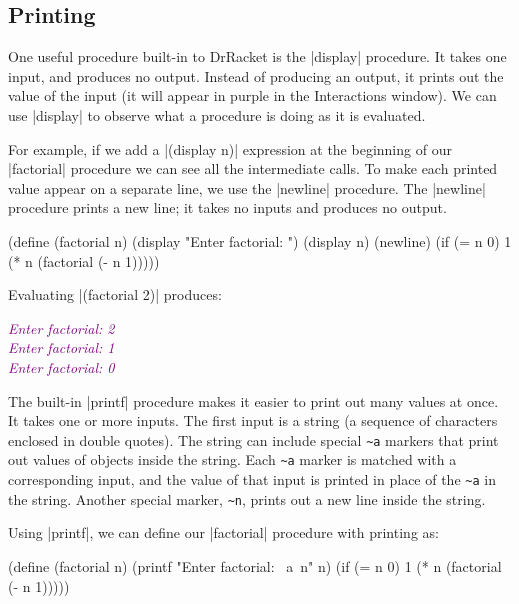 \begin{schemeregion}
\subsection{Printing}\label{sec:printing}

One useful procedure built-in to DrRacket is the \scheme|display| procedure.  It takes one input, and produces no output.  Instead of producing an output, it prints out the value of the input (it will appear in purple in the Interactions window).  We can use \scheme|display| to observe what a procedure is doing as it is evaluated.  

For example, if we add a \scheme|(display n)| expression at the beginning of our \scheme|factorial| procedure we can see all the intermediate calls.  To make each printed value appear on a separate line, we use the \scheme|newline| procedure.  The \scheme|newline| procedure prints a new line; it takes no inputs and produces no output.  

\begin{schemedisplay}
(define (factorial n)
  (display "Enter factorial: ") (display n) (newline)
  (if (= n 0) 1 (* n (factorial (- n 1)))))
\end{schemedisplay}

Evaluating \scheme|(factorial 2)| produces:
\begin{code}
\textcolor{purple}{\emph{Enter factorial: 2}}\\
\textcolor{purple}{\emph{Enter factorial: 1}}\\
\textcolor{purple}{\emph{Enter factorial: 0}}\\
\end{code}
The built-in \scheme|printf| procedure makes it easier to print out many values at once.  It takes one or more inputs.  The first input is a string (a sequence of characters enclosed in double quotes).  The string can include special \verb|~a| markers that print out values of objects inside the string.  Each \verb|~a| marker is matched with a corresponding input, and the value of that input is printed in place of the \verb|~a| in the string.  Another special marker, \verb|~n|, prints out a new line inside the string.  

Using \scheme|printf|, we can define our \scheme|factorial| procedure with printing as:
\begin{schemedisplay}
(define (factorial n)
  (printf "Enter factorial: ~a~n" n)
  (if (= n 0) 1 (* n (factorial (- n 1)))))
\end{schemedisplay}


\end{schemeregion}

